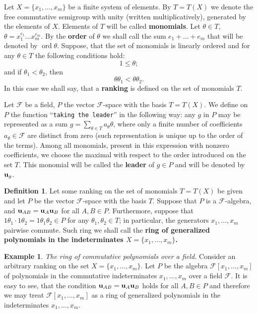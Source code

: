 \documentclass[a4paper,reqno,12pt]{amsart}
\theoremstyle{plain}
\theoremstyle{remark}
\theoremstyle{definition}
\newtheorem{example}{Example}
\newtheorem{definition}{Definition}
\DeclareMathOperator {\ord}{ord}
\def\u{\bold {u}}
\def\ord{\operatorname{ord}}
\def\F{\mathcal {F}}
\begin{document}
Let $X=\{x_1,\dots,x_m\}$ be a finite system of elements. By $T=T(X)$ we
denote the free commutative semigroup with unity (written
multiplicatively), generated by the elements of $X$. Elements of $T$
will be called {\bf monomials}. Let $\theta\in T$,
$\theta=x_1^{e_1}\dots x_m^{e_m}$. By the {\bf order} of $\theta$
we shall call the sum $e_1+\dots+e_m$ that will be denoted by $\ord\theta$. Suppose, that the set of 
monomials
is linearly ordered and for any $\theta\in T$ the following conditions
hold:
$$
  1\leq\theta;
$$
and
if $\theta_1<\theta_2$, then
$$
  \theta\theta_1<\theta\theta_2.
$$
In this case we shall say, that a {\bf ranking} is defined on the set of monomials $T$.

Let $\F$ be a field, $P$ the vector $\F$-space with the basis
$T=T(X)$. We define on $P$ the function ``{\tt taking the leader}'' 
in the
following way: any $g$ in $P$ may be represented as a sum
$g=\sum_{\theta\in T} a_\theta \theta$, where only a finite number of
coefficients $a_\theta\in \F$ are distinct from zero (such representation
is unique up to the order of the terms). Among all monomials, present in
this expression with nonzero coefficients, we choose the maximal with
respect to the order introduced on the set $T$. This monomial will be
called the {\bf leader} of $g\in P$ and will be denoted by $\u_g$. 

\begin{definition}
Let some ranking on the set of monomials $T=T(X)$ be given and let $P$ be
the vector $\F$-space with the basis $T$. Suppose that $P$ is a
$\F$-algebra, and $\u_{A B}=\u_A\u_B$ for all $A,B\in P$. Furthermore,
suppose that $1\theta_1\cdot1\theta_2=1 \theta_1\theta_2\in P$ for any
$\theta_1,\theta_2\in T$; in particular, the generators $x_1,\dots,x_m$
pairwise commute. Such ring we shall call the \bf{ring of generalized
polynomials in the indeterminates} $X=\{x_1,\dots,x_m\}$.
\end{definition}

\begin{example}\label{4.1.10} {\it The ring of commutative polynomials over a field.}
Consider an arbitrary ranking on the set $X=\{x_1,\dots,x_m\}$. Let $P$ be
the algebra $\F[x_1, \dots,x_m]$ of polynomials in the commutative
indeterminates $x_1,\dots,x_m$ over a field $\F$. It is easy to see, that
the condition $\u_{A B}=\u_A\u_B$ holds for all $A,B\in P$ and therefore
we may treat $\F[x_1,\dots,x_m]$ as a ring of generalized polynomials in
the indeterminates $x_1,\dots,x_m$.
\end{example}
\end{document}
